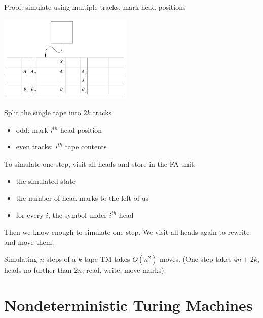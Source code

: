 \documentclass[handout]{beamer}
\begin{document}
\begin{frame}{Proof: simulate using multiple tracks, mark head positions}

    \vspace{-6pt}
    \begin{flushright}
        \hspace{3cm}\includegraphics[width=0.48\textwidth]{files/tmmultitrack.PNG}    
    \end{flushright}
    
    \vspace{-3cm}
    Split the single tape into $2k$ tracks
    
    \begin{itemize}\setlength{\itemindent}{0pt}
        \item odd: mark $i^{th}$ head position
        \item even tracks: $i^{th}$ tape contents
    \end{itemize}

    \vspace{0.5cm}

    To simulate one step, visit all heads and store in the FA unit:
    \vspace{-6pt}       
    \begin{itemize}
        \item the simulated state
        \item the number of head marks to the left of us
        \item for every $i$, the symbol under $i^{th}$ head
    \end{itemize}

    Then we know enough to simulate one step. We visit all heads again to rewrite and move them.   \hfill\qedsymbol

        
    Simulating $n$ steps of a $k$-tape TM takes $O(n^2)$ moves. (One step takes $4n+2k$, heads no further than $2n$; read, write, move marks).

\end{frame}


\section*{Nondeterministic Turing Machines}
\end{document}
